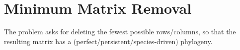 \section{Minimum Matrix Removal}

The problem asks for deleting the fewest possible rows/columns, so that the resulting matrix has a (perfect/persistent/species-driven) phylogeny. 
